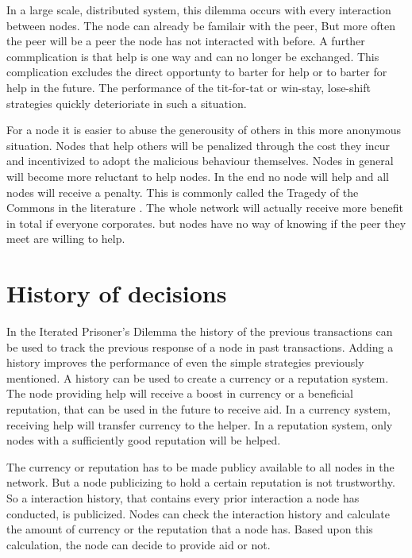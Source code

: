 In a large scale, distributed system, this dilemma occurs with every interaction between nodes.
The node can already be familair with the peer,
But more often the peer will be a peer the node has not interacted with before.
A further commplication is that help is one way and can no longer be exchanged.
This complication excludes the direct opportunty to barter for help 
or to barter for help in the future\cite{Lai-Incentives}.
The performance of the tit-for-tat or win-stay, lose-shift strategies
quickly deterioriate in such a situation.

For a node it is easier to abuse the generousity of others in this more anonymous situation.
Nodes that help others will be penalized through the cost they incur
and incentivized to adopt the malicious behaviour themselves.
Nodes in general will become more reluctant to help nodes\cite{Nowak-PrisonerDilemma}.
In the end no node will help and all nodes will receive a penalty.
This is commonly called the Tragedy of the Commons in the literature \cite{hardin-tragedy}.
The whole network will actually receive more benefit in total if everyone corporates.
but nodes have no way of knowing if the peer they meet are willing to help.

\section{History of decisions}

In the Iterated Prisoner's Dilemma the history of the previous transactions can be used 
to track the previous response of a node in past transactions.
Adding a history improves the performance of even the simple strategies previously mentioned.
A history can be used to create a currency or a reputation system.
The node providing help will receive a boost in currency or a beneficial reputation, 
that can be used in the future to receive aid.
In a currency system, receiving help will transfer currency to the helper.
In a reputation system, only nodes with a sufficiently good reputation will be helped.

The currency or reputation has to be made publicy available to all nodes in the network.
But a node publicizing to hold a certain reputation is not trustworthy.
So a interaction history, that contains every prior interaction a node has conducted, is publicized.
Nodes can check the interaction history and calculate the amount of currency 
or the reputation that a node has.
Based upon this calculation, the node can decide to provide aid or not.

